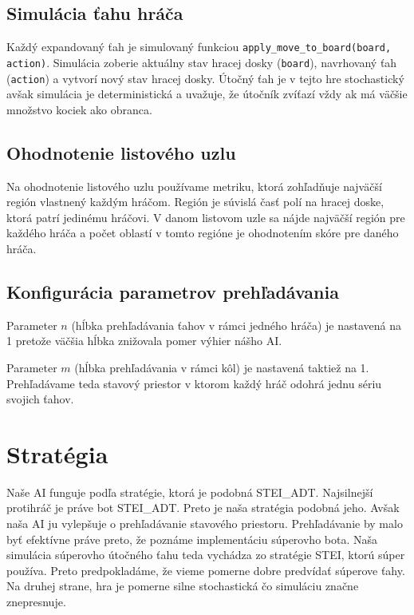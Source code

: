 \documentclass[a4paper, 11pt]{article}
\begin{document}
\subsection{Simulácia ťahu hráča}
Každý expandovaný ťah je simulovaný funkciou \texttt{apply\_move\_to\_board(board, action)}. Simulácia zoberie aktuálny stav hracej dosky (\texttt{board}), navrhovaný ťah (\texttt{action}) a vytvorí nový stav hracej dosky. Útočný ťah je v tejto hre stochastický avšak simulácia je deterministická a uvažuje, že útočník zvíťazí vždy ak má väčšie množstvo kociek ako obranca.

\subsection{Ohodnotenie listového uzlu}
Na ohodnotenie listového uzlu používame metriku, ktorá zohľadňuje najväčší región vlastnený každým hráčom. Región je súvislá časť polí na hracej doske, ktorá patrí jedinému hráčovi. V danom listovom uzle sa nájde najväčší región pre každého hráča a počet oblastí v tomto regióne je ohodnotením skóre pre daného hráča.

\subsection{Konfigurácia parametrov prehľadávania}
Parameter $n$ (hĺbka prehľadávania ťahov v rámci jedného hráča) je nastavená na 1 pretože väčšia hĺbka znižovala pomer výhier nášho AI. 

Parameter $m$ (hĺbka prehľadávania v rámci kôl) je nastavená taktiež na 1. Prehľadávame teda stavový priestor v ktorom každý hráč odohrá jednu sériu svojich ťahov.

\section{Stratégia}
Naše AI funguje podľa stratégie, ktorá je podobná STEI\_ADT. Najsilnejší protihráč je práve bot STEI\_ADT. Preto je naša stratégia podobná jeho. Avšak naša AI ju vylepšuje o prehľadávanie stavového priestoru. Prehľadávanie by malo byť efektívne práve preto, že poznáme implementáciu súperovho bota. Naša simulácia súperovho útočného ťahu teda vychádza zo stratégie STEI, ktorú súper používa. Preto predpokladáme, že vieme pomerne dobre predvídať súperove ťahy. Na druhej strane, hra je pomerne silne stochastická čo simuláciu značne znepresnuje.
\end{document}
